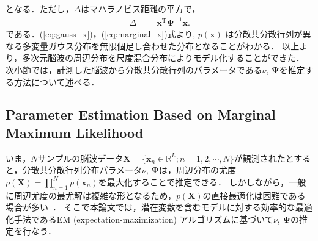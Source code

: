 \documentclass[journal]{IEEEtran}
\begin{document}
%
となる．ただし，$\Delta$はマハラノビス距離の平方で，
%
\begin{eqnarray}
	\Delta &=& \mathbf{x}^\mathrm{T}{\bm \Psi}^{-1}\mathbf{x}.
\end{eqnarray}
%
である．(\ref{eq:gauss_x})，(\ref{eq:marginal_x})式より, $p(\mathbf{x})$ は分散共分散行列が異なる多変量ガウス分布を無限個足し合わせた分布となることがわかる．
以上より，多次元脳波の周辺分布を尺度混合分布によりモデル化することができた．
次小節では，計測した脳波から分散共分散行列のパラメータである$\nu$, $\mathbf{\Psi}$を推定する方法について述べる． %

\subsection{Parameter Estimation Based on Marginal Maximum Likelihood}
いま，$N$サンプルの脳波データ$\mathbf{X} = \{\mathbf{x}_n \in \mathbb{R}^{L}; n=1,2,\cdots,N \}$が観測されたとすると，分散共分散行列分布パラメータ$\nu$, $\bm \Psi$は，周辺分布の尤度$p(\mathbf{X}) = \prod_{n=1}^{N} p(\mathbf{x}_n)$を最大化することで推定できる．
しかしながら，一般に周辺尤度の最尤解は複雑な形となるため，$p(\mathbf{X})$の直接最適化は困難である場合が多い~\cite{t2006}．
そこで本論文では，潜在変数を含むモデルに対する効率的な最適化手法であるEM (expectation-maximization) アルゴリズム\cite{Models1998}に基づいて$\nu$, $\bm \Psi$の推定を行なう．
\end{document}
